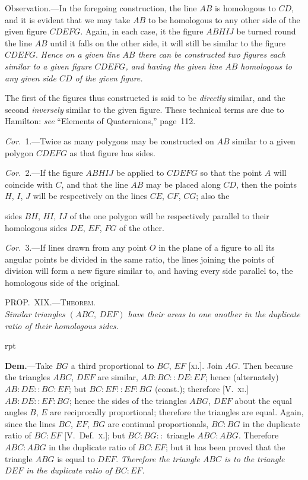 \documentclass[oneside]{book}
\newcounter{wrapwidth}
\newcommand\myprop[2]{
\bigskip\Needspace*{4\baselineskip}\begin{center}\textsc{#1}\\\medskip\emph{#2}\par\end{center}
}
\newcommand\imgflow[3]{
\setcounter{wrapwidth}{#1}

\begin{wrapfigure}[#2]{r}{\value{wrapwidth}pt}
\begin{center}
\vspace{-0.3in}

\end{center}
\end{wrapfigure}
}
\begin{document}
\smallskip
\begin{footnotesize}
\textsf{Observation.}---In the foregoing construction, the line $AB$ is
homologous to $CD$, and it is evident that we may take $AB$ to
be homologous to any other side of the given figure $CDEFG$.
Again, in each case, it the figure $ABHIJ$ be turned round the line
$AB$ until it falls on the other side, it will still be similar to the
figure $CDEFG$. \emph{Hence on a given line $AB$ there can be constructed
two figures each similar to a given figure $CDEFG$, and having the
given line $AB$ homologous to any given side $CD$ of the given figure.}

The first of the figures thus constructed is said to be \emph{directly}
similar, and the second \emph{inversely} similar to the given figure.
These technical terms are due to Hamilton: \emph{see} ``Elements of
Quaternions,'' page~112.
\par\end{footnotesize}

\emph{Cor.}~1.---Twice as many polygons may be constructed
on $AB$ similar to a given polygon $CDEFG$ as
that figure has sides.

\emph{Cor.}~2.---If the figure $ABHIJ$ be applied to $CDEFG$
so that the point $A$ will coincide with $C$, and that the
line $AB$ may be placed along $CD$, then the points $H$, $I$, $J$
will be respectively on the lines $CE$, $CF$, $CG$; also the

sides $BH$, $HI$, $IJ$ of the one polygon will be respectively
parallel to their homologous sides $DE$, $EF$, $FG$
of the other.

\emph{Cor.}~3.---If lines drawn from any point $O$ in the
plane of a figure to all its angular points be divided in
the same ratio, the lines joining the points of division
will form a new figure similar to, and having every
side parallel to, the homologous side of the original.

\myprop{PROP\@.~XIX\@.---Theorem.}{Similar triangles $(ABC,\ DEF)$ have their areas to
one another in the duplicate ratio of their homologous
sides.}


\imgflow{178}{9}{f196}

\textbf{Dem.}---Take $BG$ a third proportional to $BC$, $EF$
[\textsc{xi.}]. Join $AG$. Then
because the triangles
$ABC$, $DEF$ are similar,
$AB : BC :: DE : EF$;
hence (alternately) $AB
: DE :: BC : EF$; but
$BC : EF :: EF : BG$
(const.); therefore [V.~\textsc{xi.}]
$AB : DE :: EF :
BG$; hence the sides of the triangles $ABG$, $DEF$ about
the equal angles $B$, $E$ are reciprocally proportional;
therefore the triangles are equal. Again, since the
lines $BC$, $EF$, $BG$ are continual proportionals, $BC : BG$
in the duplicate ratio of $BC : EF$ [V.~Def.~\textsc{x.}]; but
$BC : BG ::$ triangle $ABC : ABG$. Therefore $ABC : ABG$
in the duplicate ratio of $BC : EF$; but it has been
proved that the triangle $ABG$ is equal to $DEF$. \emph{Therefore
the triangle $ABC$ is to the triangle $DEF$ in the
duplicate ratio of $BC : EF$.}
\end{document}
